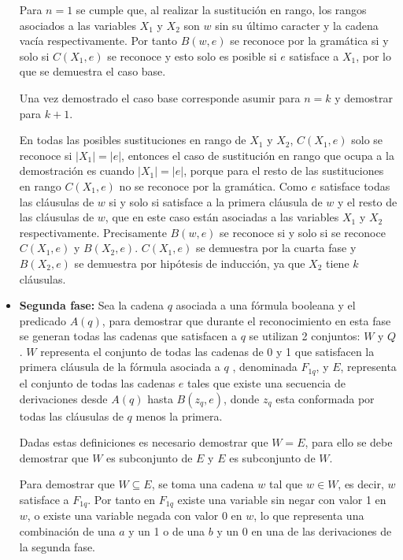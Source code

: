 \begin{itemize}
          Para $n=1$ se cumple que, al realizar la sustitución en rango, los rangos asociados a las variables $X_1$ y $X_2$ son $w$ sin su último caracter y la cadena
          vacía respectivamente. Por tanto $B(w,e)$ se reconoce por la gramática si y solo si $C(X_1,e)$ se reconoce y
          esto solo es posible si $e$ satisface a $X_1$, por lo que se demuestra el caso base.
          
          Una vez demostrado el caso base corresponde asumir para $n=k$ y demostrar para $k+1$.
          
          En todas las posibles sustituciones en rango de $X_1$ y $X_2$, $C(X_1,e)$ solo se reconoce si $|X_1|=|e|$, entonces el caso de sustitución en rango que ocupa a la demostración
          es cuando $|X_1|=|e|$, porque para el resto de las sustituciones en rango $C(X_1,e)$ no se reconoce por la gramática.
          Como $e$ satisface todas las cláusulas de $w$ si y solo si satisface a la primera cláusula de $w$ y el resto de las cláusulas de $w$, que en este caso
          están asociadas a las variables $X_1$ y $X_2$ respectivamente. Precisamente $B(w,e)$ se reconoce si y solo si se reconoce $C(X_1,e)$ y $B(X_2,e)$. $C(X_1,e)$ se demuestra por la cuarta fase y $B(X_2,e)$ se demuestra por hipótesis de inducción, ya que $X_2$ tiene $k$ cláusulas.
          
    \item \textbf{Segunda fase:} Sea la cadena $q$ asociada a una fórmula booleana y el predicado $A(q)$, para
          demostrar que durante el reconocimiento en esta fase se generan todas las cadenas que satisfacen a $q$ se
          utilizan 2 conjuntos: $W$ y $Q$. $W$ representa el conjunto de todas las cadenas de 0 y 1 que satisfacen la
          primera cláusula de la fórmula asociada a $q$ , denominada $F_{1q}$, y $E$, representa el conjunto de todas
          las cadenas $e$ tales que existe una secuencia de derivaciones desde $A(q)$ hasta $B(z_q,e)$, donde $z_q$
          esta conformada por todas las cláusulas de $q$ menos la primera.
          
          Dadas estas definiciones es necesario demostrar que $W=E$, para ello se debe demostrar que $W$ es subconjunto de $E$ y $E$ es subconjunto de $W$.
          
          Para demostrar que $W\subseteq E$, se toma una cadena $w$ tal que $w\in W$, es decir, $w$ satisface a $F_{1q}$. Por tanto en $F_{1q}$ existe una variable sin negar con valor 1 en $w$, o existe una variable negada con valor 0 en $w$, lo que representa una combinación de una $a$ y un 1 o de una $b$ y un 0 en una de las derivaciones de la segunda fase.
          

\end{itemize}

